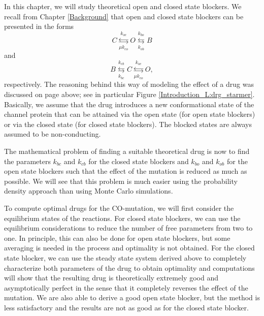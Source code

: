 In this chapter, we will study theoretical open and closed state blockers. We recall from Chapter \ref{Background} that open and closed state blockers can be presented in the forms 
\begin{equation}
C\underset{ \mu k_{co}}{\overset{k_{oc}}{\leftrightarrows}}O\underset{k_{ob}
}{\overset{k_{bo}}{\leftrightarrows}}B \label{open_block2}
\end{equation}
and
\begin{equation}
B\underset{k_{bc}}{\overset{k_{cb}}{\leftrightarrows}}C\underset{
\mu k_{co}}{\overset{k_{oc}}{\leftrightarrows}}O, \label{closed_block2}
\end{equation}
respectively.  The reasoning behind this way of modeling the effect of a drug was discussed on page \pageref{theoreticaldrugs} above; see in particular Figure \ref{Introduction_L:drg_starmer}. Basically, we assume that the drug introduces a new conformational state of the channel protein that can be attained via the open state (for open state blockers) or via the closed state (for closed state blockers). The blocked states are always assumed to be non-conducting.

The mathematical problem of finding a suitable theoretical drug is now to find the parameters $ k_{bc}$ and $k_{cb}$ for the closed state blockers and $ k_{bo}$ and $k_{ob}$ for the open state blockers such that the effect of the mutation is reduced as much as possible. We will see that this problem is much easier using the probability density approach than using Monte Carlo simulations. 

To compute optimal drugs for the CO-mutation, we will first consider the equilibrium states of the reactions. For closed state blockers, we can use the equilibrium considerations to reduce the number of free parameters from two to one. In principle, this can also be done for open state blockers, but some averaging is needed in the process and optimality is not obtained. For the closed state blocker, we can use the steady state system derived above to completely characterize both parameters of the drug to obtain optimality and computations will show that the resulting drug is theoretically extremely good and asymptotically perfect in the sense that it completely reverses the effect of the mutation. We are also able to derive a good open state blocker, but the method is less satisfactory and the results are not as good as for the closed state blocker.


